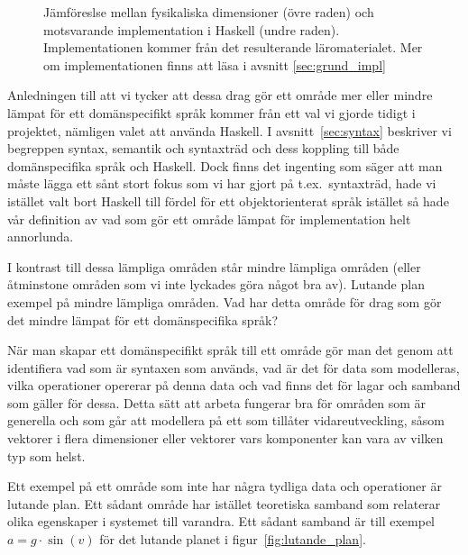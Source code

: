 \begin{draft}
\begin{figure}[tph]
  \centering
  \caption{Jämföreslse mellan fysikaliska dimensioner (övre raden) och motsvarande implementation i Haskell (undre raden). Implementationen kommer från det resulterande läromaterialet. Mer om implementationen finns att läsa i avsnitt \ref{sec:grund_impl}}
  \label{fig:haskell_fysik_likhet}
\end{figure}

Anledningen till att vi tycker att dessa drag gör ett område mer eller
mindre lämpat för ett domänspecifikt språk kommer från ett val vi gjorde tidigt
i projektet, nämligen valet att använda Haskell. I avsnitt~\ref{sec:syntax}
beskriver vi begreppen syntax, semantik och syntaxträd och dess koppling till
både domänspecifika språk och Haskell. Dock finns det ingenting som säger att
man måste lägga ett sånt stort fokus som vi har gjort på t.ex.~syntaxträd, hade
vi istället valt bort Haskell till fördel för ett objektorienterat språk
istället så hade vår definition av vad som gör ett område lämpat för
implementation helt annorlunda.

I kontrast till dessa lämpliga områden står mindre lämpliga områden (eller
åtminstone områden som vi inte lyckades göra något bra av). Lutande plan exempel
på mindre lämpliga områden. Vad har detta område för drag som gör det mindre
lämpat för ett domänspecifika språk?

När man skapar ett domänspecifikt språk till ett område gör man det genom att
identifiera vad som är syntaxen som används, vad är det för data som modelleras,
vilka operationer opererar på denna data och vad finns det för lagar och samband
som gäller för dessa. Detta sätt att arbeta fungerar bra för områden som är
generella och som går att modellera på ett som tillåter vidareutveckling, såsom
vektorer i flera dimensioner eller vektorer vars komponenter kan vara av vilken
typ som helst.

Ett exempel på ett område som inte har några tydliga data och operationer är
lutande plan. Ett sådant område har istället teoretiska samband som relaterar
olika egenskaper i systemet till varandra. Ett sådant samband är till exempel $a = g \cdot \sin(v)$ för det lutande planet i figur~\ref{fig:lutande_plan}.


\end{draft}
